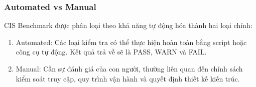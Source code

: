 \subsubsection{Automated vs Manual}\label{automated-vs-manual}

CIS Benchmark được phân loại theo khả năng tự động hóa thành hai loại chính:

\begin{enumerate}
\def\labelenumi{(\arabic{enumi})}
\item
  Automated: Các loại kiểm tra có thể thực hiện hoàn toàn bằng script hoặc công cụ tự động. Kết quả trả về sẽ là PASS, WARN và FAIL.
\item
  Manual: Cần sự đánh giá của con người, thường liên quan đến chính sách kiểm soát truy cập, quy trình vận hành và quyết định thiết kế kiến trúc.
\end{enumerate}
